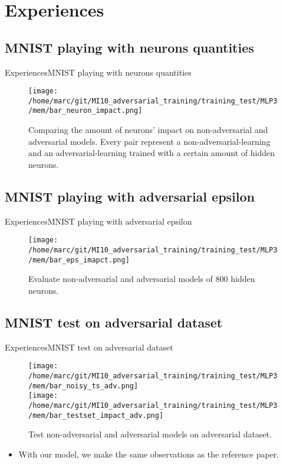 \documentclass[10pt]{beamer}
\begin{document}
\section{Experiences}

\subsection{MNIST playing with neurons quantities}
\begin{frame}{Experiences}{MNIST playing with neurons quantities}
  \pause
  \begin{figure}
    \centering
    \texttt{[image: /home/marc/git/MI10\_adversarial\_training/training\_test/MLP3/mem/bar\_neuron\_impact.png]}
    \caption{Comparing the amount of neurons' impact on non-adversarial and adversarial models. Every pair represent a non-adversarial-learning and an adversarial-learning trained with a certain amount of hidden neurons.}
    \label{fig:mnist_neurons}
  \end{figure}
\end{frame}

\subsection{MNIST playing with adversarial epsilon}
\begin{frame}{Experiences}{MNIST playing with adversarial epsilon}
  \pause
  \begin{figure}
    \centering
    \texttt{[image: /home/marc/git/MI10\_adversarial\_training/training\_test/MLP3/mem/bar\_eps\_imapct.png]}
    \caption{Evaluate non-adversarial and adversarial models of 800 hidden neurons.}
    \label{fig:mnist_adv_eps}
  \end{figure}
\end{frame}

\subsection{MNIST test on adversarial dataset}
\begin{frame}{Experiences}{MNIST test on adversarial dataset}
  \begin{figure}
    \centering
    \texttt{[image: /home/marc/git/MI10\_adversarial\_training/training\_test/MLP3/mem/bar\_noisy\_ts\_adv.png]}\\
    \pause
    \texttt{[image: /home/marc/git/MI10\_adversarial\_training/training\_test/MLP3/mem/bar\_testset\_impact\_adv.png]}
    \caption{Test non-adversarial and adversarial models on adversarial dataset.}
    \label{fig:mnist_adv_result}
  \end{figure}
  \pause
  \begin{itemize}
      \item With our model, we make the same observations as the reference paper.
    \end{itemize}  
\end{frame}
\end{document}
